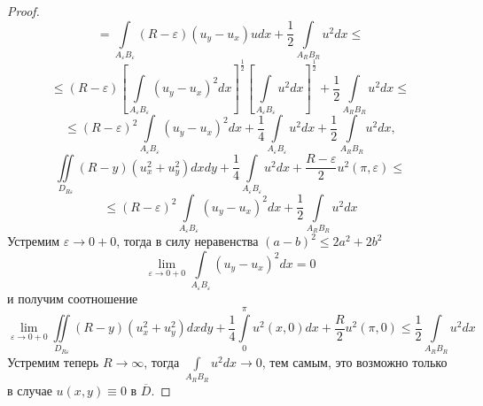 \documentclass[a4paper, 12pt]{article}
\numberwithin{equation}{section}
\numberwithin{lemma}{section}
\numberwithin{definition}{section}
\numberwithin{notabene}{section}
\numberwithin{corollary}{section}
\begin{document}
\begin{proof}
\begin{equation*}
	\end{equation*}
	\begin{equation*}
		= \int\limits_{A_\varepsilon B_\varepsilon} \left(R - \varepsilon \right) \left(u_y - u_x\right)u dx + \dfrac12  \int\limits_{A_R B_R} u^2 dx \leq
	\end{equation*}
	\begin{equation*}
		\leq \left(R - \varepsilon\right) \left[\int\limits_{A_\varepsilon B_\varepsilon} \left( u_y - u_x\right)^2 dx \right]^{\frac12} \left[\int\limits_{A_\varepsilon B_\varepsilon} u^2 dx \right]^{\frac12} + \dfrac12 \int\limits_{A_RB_R} u^2 dx \leq
	\end{equation*}
	\begin{equation*}
		\leq \left(R - \varepsilon\right)^2 \int\limits_{A_\varepsilon B_\varepsilon} \left( u_y - u_x\right)^2 dx + \dfrac14 \int\limits_{A_\varepsilon B_\varepsilon} u^2 dx +\dfrac12 \int\limits_{A_RB_R} u^2 dx, 
	\end{equation*}
	\begin{equation*}
		\iint\limits_{D_{R\varepsilon}} \left(R - y\right) \left(u_x^2 + u_y^2\right) dx dy + \dfrac{1}{4}\int\limits_{A_\varepsilon B_\varepsilon} u^2 dx +\dfrac{R - \varepsilon}{2}u^2(\pi, \varepsilon) \leq 
	\end{equation*}
	\begin{equation*}
		\leq \left(R - \varepsilon\right)^2 \int\limits_{A_\varepsilon B_\varepsilon} \left( u_y - u_x\right)^2 dx  +\dfrac12 \int\limits_{A_RB_R} u^2 dx
	\end{equation*}
	Устремим $\varepsilon \to 0 + 0$, тогда в силу неравенства $(a-b)^2 \leq 2a^2 + 2b^2$
	\begin{equation*}
		\lim\limits_{\varepsilon \to 0 + 0} \int\limits_{A_\varepsilon B_\varepsilon} \left(u_y - u_x\right)^2 dx = 0
	\end{equation*}
	и получим соотношение
	\begin{equation*}
		\lim\limits_{\varepsilon \to 0 + 0} \iint\limits_{D_{R\varepsilon}} \left(R - y\right) \left(u_x^2 + u_y^2 \right) dx dy + \dfrac14 \int\limits_0^\pi u^2(x,0) dx + \dfrac{R}{2}u^2(\pi,0) \leq \dfrac12 \int\limits_{A_RB_R} u^2 dx
	\end{equation*}
	Устремим теперь $R \to \infty$, тогда $\int\limits_{A_RB_R} u^2 dx \to 0$, тем самым, это возможно только в случае $u(x,y) \equiv 0$ в $\overline{D}$.
\end{proof}
\newpage
{}
\vspace{-2.3cm}
\renewcommand{\refname}{\begin{center}
{\normalsize \rm СПИСОК ЛИТЕРАТУРЫ} \end{center}}
\end{document}

